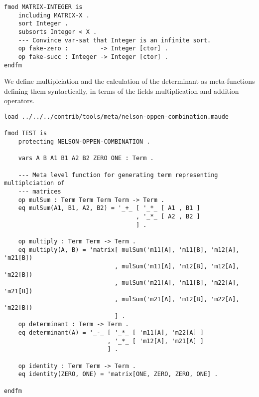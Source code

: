 \documentclass[]{article}
\begin{document}
\begin{verbatim}
fmod MATRIX-INTEGER is
    including MATRIX-X .
    sort Integer .
    subsorts Integer < X .
    --- Convince var-sat that Integer is an infinite sort.
    op fake-zero :         -> Integer [ctor] .
    op fake-succ : Integer -> Integer [ctor] .
endfm
\end{verbatim}

We define multiplciation and the calculation of the determinant as
meta-functions defining them syntactically, in terms of the fields
multiplication and addition operators.

\begin{verbatim}
load ../../../contrib/tools/meta/nelson-oppen-combination.maude

fmod TEST is
    protecting NELSON-OPPEN-COMBINATION .

    vars A B A1 B1 A2 B2 ZERO ONE : Term .

    --- Meta level function for generating term representing multiplciation of
    --- matrices
    op mulSum : Term Term Term Term -> Term .
    eq mulSum(A1, B1, A2, B2) = '_+_ [ '_*_ [ A1 , B1 ]
                                     , '_*_ [ A2 , B2 ]
                                     ] .

    op multiply : Term Term -> Term .
    eq multiply(A, B) = 'matrix[ mulSum('m11[A], 'm11[B], 'm12[A], 'm21[B])
                               , mulSum('m11[A], 'm12[B], 'm12[A], 'm22[B])
                               , mulSum('m21[A], 'm11[B], 'm22[A], 'm21[B])
                               , mulSum('m21[A], 'm12[B], 'm22[A], 'm22[B])
                               ] .
    op determinant : Term -> Term .
    eq determinant(A) = '_-_ [ '_*_ [ 'm11[A], 'm22[A] ]
                             , '_*_ [ 'm12[A], 'm21[A] ]
                             ] .

    op identity : Term Term -> Term .
    eq identity(ZERO, ONE) = 'matrix[ONE, ZERO, ZERO, ONE] .

endfm
\end{verbatim}
\end{document}
